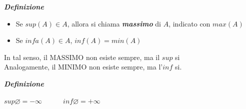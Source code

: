 \documentclass{article}
\theoremstyle{definition}
\begin{document}
\begin{center}
    \textbf{\textit{Definizione}}
\end{center}

\begin{itemize}
    \item Se $sup(A) \in A$, allora si chiama \textbf{\textit{massimo}} di $A$, indicato con $max(A)$
    \item Se $infa(A) \in A$, $inf(A) =min(A)$
\end{itemize}
In tal senso, il MASSIMO non esiste sempre, ma il $sup$ si
\\ Analogamente, il MINIMO non esiste sempre, ma l'$inf$ si.

\begin{center}
\textbf{\textit{Definizione}}
\end{center}
\begin{center}
    $sup \varnothing = -\infty$ \,\,\,\,\,\,\,\,\,\,\,\,\,\, $inf \varnothing = +\infty$
\end{center}

\begin{center}
\end{center}
\end{document}
